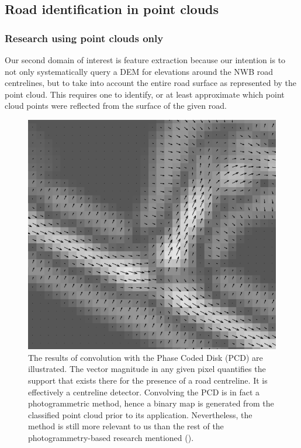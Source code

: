 \subsection{Road identification in point clouds}
\label{sub:roadidentification}
\subsubsection*{Research using point clouds only}

Our second domain of interest is feature extraction because our intention is to not only systematically query a DEM for elevations around the NWB road centrelines, but to take into account the entire road surface as represented by the point cloud. This requires one to identify, or at least approximate which point cloud points were reflected from the surface of the given road.

\begin{figure}
    \includegraphics[width=\linewidth]{p2/figs/clode_etal_2007_01.png} 
    \caption{The results of convolution with the Phase Coded Disk (PCD) are illustrated. The vector magnitude in any given pixel quantifies the support that exists there for the presence of a road centreline. It is effectively a centreline detector. Convolving the PCD is in fact a photogrammetric method, hence a binary map is generated from the classified point cloud prior to its application. Nevertheless, the method is still more relevant to us than the rest of the photogrammetry-based research mentioned (\cite{clode_etal_2007}).}
    \label{fig:phasecodeddisk}
\end{figure}

